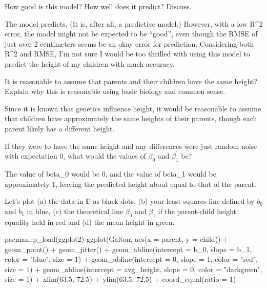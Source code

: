 \documentclass[
]{article}
\newenvironment{Shaded}{\begin{snugshade}}{\end{snugshade}}
\newcommand{\AttributeTok}[1]{\textcolor[rgb]{0.77,0.63,0.00}{#1}}
\newcommand{\DecValTok}[1]{\textcolor[rgb]{0.00,0.00,0.81}{#1}}
\newcommand{\FloatTok}[1]{\textcolor[rgb]{0.00,0.00,0.81}{#1}}
\newcommand{\FunctionTok}[1]{\textcolor[rgb]{0.00,0.00,0.00}{#1}}
\newcommand{\NormalTok}[1]{#1}
\newcommand{\SpecialCharTok}[1]{\textcolor[rgb]{0.00,0.00,0.00}{#1}}
\newcommand{\StringTok}[1]{\textcolor[rgb]{0.31,0.60,0.02}{#1}}
\begin{document}
How good is this model? How well does it predict? Discuss.

The model predicts. (It is, after all, a predictive model.) However,
with a low R\^{}2 error, the model might not be expected to be ``good'',
even though the RMSE of just over 2 centimeters seems be an okay error
for prediction. Considering both R\^{}2 and RMSE, I'm not sure I would
be too thrilled with using this model to predict the height of my
children with much accuracy.

It is reasonable to assume that parents and their children have the same
height? Explain why this is reasonable using basic biology and common
sense.

Since it is known that genetics influence height, it would be reasonable
to assume that children have approximately the same heights of their
parents, though each parent likely has a different height.

If they were to have the same height and any differences were just
random noise with expectation 0, what would the values of \(\beta_0\)
and \(\beta_1\) be?

The value of beta\_0 would be 0, and the value of beta\_1 would be
approximately 1, leaving the predicted height about equal to that of the
parent.

Let's plot (a) the data in \(\mathbb{D}\) as black dots, (b) your least
squares line defined by \(b_0\) and \(b_1\) in blue, (c) the theoretical
line \(\beta_0\) and \(\beta_1\) if the parent-child height equality
held in red and (d) the mean height in green.

\begin{Shaded}
\begin{Highlighting}[]
\NormalTok{pacman}\SpecialCharTok{::}\FunctionTok{p\_load}\NormalTok{(ggplot2)}
\FunctionTok{ggplot}\NormalTok{(Galton, }\FunctionTok{aes}\NormalTok{(}\AttributeTok{x =}\NormalTok{ parent, }\AttributeTok{y =}\NormalTok{ child)) }\SpecialCharTok{+} 
  \FunctionTok{geom\_point}\NormalTok{() }\SpecialCharTok{+} 
  \FunctionTok{geom\_jitter}\NormalTok{() }\SpecialCharTok{+}
  \FunctionTok{geom\_abline}\NormalTok{(}\AttributeTok{intercept =}\NormalTok{ b\_0, }\AttributeTok{slope =}\NormalTok{ b\_1, }\AttributeTok{color =} \StringTok{"blue"}\NormalTok{, }\AttributeTok{size =} \DecValTok{1}\NormalTok{) }\SpecialCharTok{+}
  \FunctionTok{geom\_abline}\NormalTok{(}\AttributeTok{intercept =} \DecValTok{0}\NormalTok{, }\AttributeTok{slope =} \DecValTok{1}\NormalTok{, }\AttributeTok{color =} \StringTok{"red"}\NormalTok{, }\AttributeTok{size =} \DecValTok{1}\NormalTok{) }\SpecialCharTok{+}
  \FunctionTok{geom\_abline}\NormalTok{(}\AttributeTok{intercept =}\NormalTok{ avg\_height, }\AttributeTok{slope =} \DecValTok{0}\NormalTok{, }\AttributeTok{color =} \StringTok{"darkgreen"}\NormalTok{, }\AttributeTok{size =} \DecValTok{1}\NormalTok{) }\SpecialCharTok{+}
  \FunctionTok{xlim}\NormalTok{(}\FloatTok{63.5}\NormalTok{, }\FloatTok{72.5}\NormalTok{) }\SpecialCharTok{+} 
  \FunctionTok{ylim}\NormalTok{(}\FloatTok{63.5}\NormalTok{, }\FloatTok{72.5}\NormalTok{) }\SpecialCharTok{+}
  \FunctionTok{coord\_equal}\NormalTok{(}\AttributeTok{ratio =} \DecValTok{1}\NormalTok{)}
\end{Highlighting}
\end{Shaded}
\end{document}

